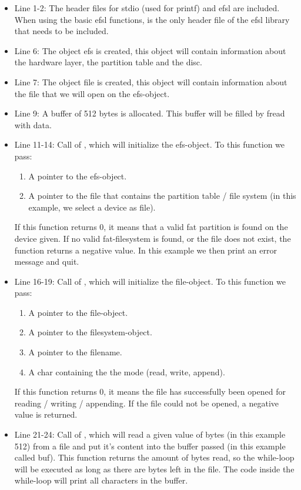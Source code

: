 \begin{itemize}
	\item{Line 1-2: The header files for stdio (used for printf) and efsl 
		are included. When using the basic efsl functions,  is
		the only header file of the efsl library that needs to be included.}
	\item{Line 6: The object efs is created, this object will contain 
		information about the hardware layer, the partition table and
		the disc.}
	\item{Line 7: The object file is created, this object will contain
		information about the file that we will open on the efs-object.}
	\item{Line 9: A buffer of 512 bytes is allocated. This buffer will
	 	be filled by fread with data.}
	\item{Line 11-14: Call of , which will initialize the efs-object.
		To this function we pass:
		\begin{enumerate}
			\item{A pointer to the efs-object.}
			\item{A pointer to the file that contains the partition table /
				file system (in this example, we select a device as file).}
		\end{enumerate}
		If this function returns 0, it means that a valid fat partition is
		found on the device given. 
		If no valid fat-filesystem is found, or the file does not exist, the 
		function returns a negative value. In this example we then print an
		error message and quit.}
	\item{Line 16-19: Call of , which will initialize the 
		file-object. To this function we pass:
		\begin{enumerate}
			\item{A pointer to the file-object.}
			\item{A pointer to the filesystem-object.} 
			\item{A pointer to the filename.}
			\item{A char containing the the mode (read, write, append).}
		\end{enumerate}
		If this function returns 0, it means the file has successfully been
		opened for reading / writing / appending.
		If the file could not be opened, a negative value is returned.
	}
	\item{Line 21-24: Call of , which will read a given value of
		bytes (in this example 512) from a file and put it's content into
		the buffer passed (in this example called buf). This function returns
		the amount of bytes read, so the while-loop will be executed as long
		as there are bytes left in the file. The code inside the while-loop
		will print all characters in the buffer.}
\end{itemize}
